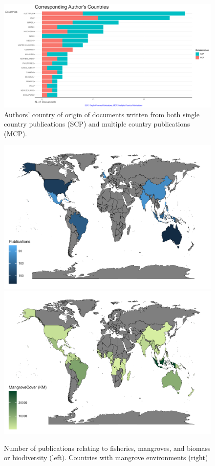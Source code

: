 \documentclass[
  12pt,
]{article}
\begin{document}
\begin{figure}
\includegraphics[width=1\linewidth]{AuthorCountries} \caption{Authors' country of origin of documents written from both single country publications (SCP) and multiple country publications (MCP). \label{AuthorCountries}}\label{fig:AuthorCountries}
\end{figure}



\begin{figure}
\includegraphics[width=0.5\linewidth]{Wulfing_BibASubmission_files/figure-latex/countryMap-1} \includegraphics[width=0.5\linewidth]{Wulfing_BibASubmission_files/figure-latex/countryMap-2} \caption{Number of publications relating to fisheries, mangroves, and biomass or biodiversity (left). Countries with mangrove environments (right) \label{countryMap}}\label{fig:countryMap}
\end{figure}
\end{document}
